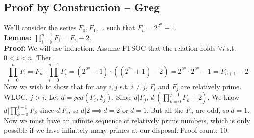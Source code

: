 \documentclass[12pt]{scrartcl}
\begin{document}

\subsection*{Proof by Construction -- Greg}
We'll consider the series $F_0, F_1,...$ such that $F_n = 2^{2^n}+1$. \\
\textbf{Lemma:} $\prod^{n-1}_{i=0}{F_i} = F_n - 2$.\\
\textbf{Proof:} We will use induction. Assume FTSOC that the relation holds $\forall i$ s.t. $0 < i < n$. Then $$\prod^{n}_{i=0}{F_i} = F_n \cdot \prod^{n-1}_{i=0}{F_i} = (2^{2^n}+1)\cdot((2^{2^n}+1)-2) = 2^{2^n}\cdot2^{2^n} - 1 = F_{n+1}-2$$
Now we wish to show that for any $i, j$ s.t. $i \neq j$, $F_i$ and $F_j$ are relatively prime. WLOG, $j > i$. Let $d = gcd(F_i, F_j)$. Since $d | F_j$, $d | (\prod^{j-1}_{k=0}F_k + 2)$. We know $d | \prod^{j-1}_{k=0}F_k$ since $d | F_i$, so $d | 2 \implies d = 2$ or $d = 1$. But all the $F_n$ are odd, so $d=1$. Now we must have an infinite sequence of relatively prime numbers, which is only possible if we have infinitely many primes at our disposal. Proof count: 10.
\end{document}

